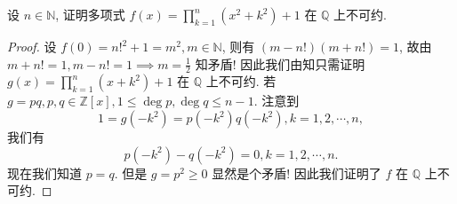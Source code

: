 \documentclass[../../main.tex]{subfiles}
\begin{document}
\begin{example}
设 \( n \in \mathbb{N} \), 证明多项式 \( f(x) = \prod_{k=1}^n (x^2 + k^2) + 1 \) 在 \( \mathbb{Q} \) 上不可约.
\end{example}
\begin{proof}
设 \( f(0) = n!^2 + 1 = m^2, m \in \mathbb{N} \), 则有 \( (m - n!)(m + n!) = 1 \), 故由 \( m + n! = 1, m - n! = 1 \implies m = \frac{1}{2} \) 知矛盾! 因此我们由知只需证明 \( g(x) = \prod_{k=1}^n (x + k^2) + 1 \) 在 \( \mathbb{Q} \) 上不可约. 若 \( g = pq, p,q \in \mathbb{Z}[x], 1 \leqslant \deg p, \deg q \leqslant n - 1 \). 注意到
\[
1 = g(-k^2) = p(-k^2)q(-k^2), k = 1,2,\cdots,n,
\]
我们有
\[
p(-k^2) - q(-k^2) = 0, k = 1,2,\cdots,n.
\]
现在我们知道 \( p = q \). 但是 \( g = p^2 \geqslant 0 \) 显然是个矛盾! 因此我们证明了 \( f \) 在 \( \mathbb{Q} \) 上不可约.

\end{proof}
\end{document}
